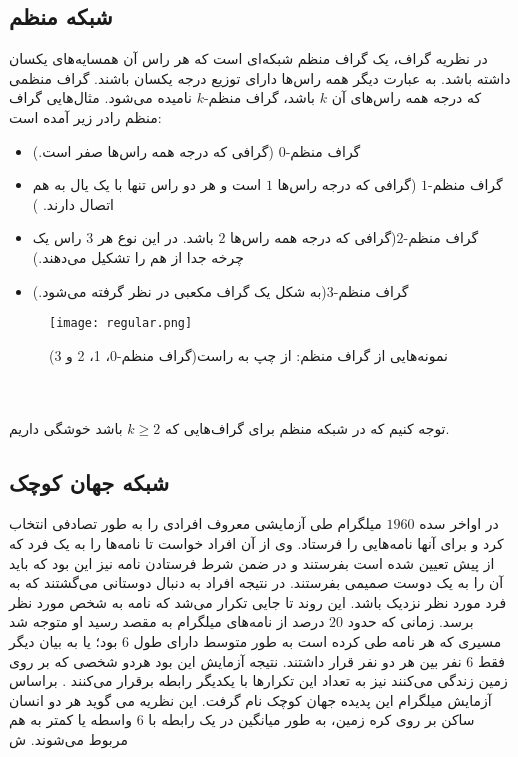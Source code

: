 \subsection{شبکه منظم}
در نظریه گراف، یک گراف منظم شبکه‌ای است که هر راس آن همسایه‌های یکسان داشته باشد. به عبارت دیگر همه راس‌ها دارای توزیع درجه یکسان باشند. گراف منظمی که درجه همه راس‌های آن $k$ باشد، گراف منظم-$k$ نامیده می‌شود. 
مثال‌هایی  گراف منظم رادر زیر آمده است:
\begin{itemize}
\item گراف منظم-$0$ (گرافی که درجه همه راس‌ها صفر است.)
\item گراف منظم-$1$ (گرافی که درجه راس‌ها  $1$ است و هر دو راس تنها با یک یال به هم اتصال دارند. )
\item  گراف منظم-$2$(گرافی که درجه همه راس‌ها $2$ باشد. در این نوع هر $3$ راس یک چرخه جدا از هم را تشکیل می‌دهند.)
\item گراف منظم-$3$(به شکل یک گراف مکعبی در نظر گرفته می‌شود.)
\end{itemize}
\begin{figure} [htbp]
\centering
\texttt{[image: regular.png]}
\caption[نمونه‌هایی از گراف منظم] {\footnotesize نمونه‌هایی از گراف منظم: از چپ به راست(گراف منظم-0، 1، 2 و 3)}\cite{network}
\label{fig:regular}
\end{figure}\\\\
توجه کنیم که در شبکه منظم برای گراف‌هایی که 
$k  \geq 2$ باشد خوشگی داریم.
\subsection{شبکه جهان کوچک}
در اواخر سده $1960$ میلگرام طی آزمایشی معروف افرادی را به طور تصادفی انتخاب کرد و برای آنها نامه‌هایی را فرستاد. وی از آن افراد خواست تا نامه‌ها را به یک فرد که از پیش تعیین شده است بفرستند و در ضمن شرط فرستادن نامه نیز این بود که باید آن را به یک دوست صمیمی بفرستند. در نتیجه افراد به دنبال دوستانی می‌گشتند که به فرد مورد نظر نزدیک باشد. این روند تا جایی تکرار می‌شد که نامه به شخص مورد نظر برسد. زمانی که حدود $20$ درصد از نامه‌های میلگرام به مقصد رسید او متوجه شد  مسیری که هر نامه طی کرده است به طور متوسط دارای طول $6$ بود؛ یا به بیان دیگر فقط $6$ نفر بین هر دو نفر قرار داشتند. نتیجه آزمایش این بود هردو شخصی که بر روی زمین زندگی می‌کنند نیز به تعداد این تکرار‌ها با یکدیگر رابطه برقرار می‌کنند \cite{milgram,traver}. براساس آزمایش میلگرام این پدیده جهان کوچک نام گرفت. 
این نظریه  می گوید هر دو انسان ساکن بر روی کره زمین، به طور میانگین در یک رابطه با $6$ واسطه یا کمتر به هم مربوط می‌شوند.
ش %

